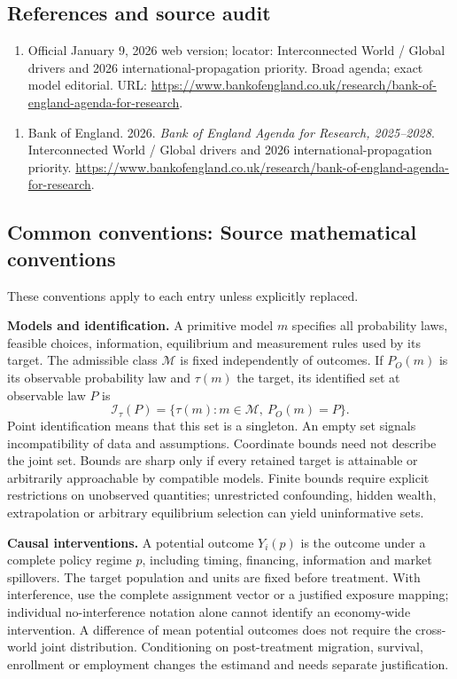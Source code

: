\documentclass[11pt,a4paper]{article}
\begin{document}
\subsection*{References and source audit}
\begin{enumerate}
\item Official January 9, 2026 web version; locator: Interconnected World / Global drivers and 2026 international-propagation priority. Broad agenda; exact model editorial. URL: \url{https://www.bankofengland.co.uk/research/bank-of-england-agenda-for-research}.
\end{enumerate}
\begin{enumerate}\raggedright
\item\hypertarget{definitions:source:30007615:1}{} Bank of England. 2026. \emph{Bank of England Agenda for Research, 2025–2028}. Interconnected World / Global drivers and 2026 international-propagation priority.
\url{https://www.bankofengland.co.uk/research/bank-of-england-agenda-for-research}.
\end{enumerate}

\subsection*{Common conventions: Source mathematical conventions}

These conventions apply to each entry unless explicitly replaced.

\textbf{Models and identification.} A primitive model \(m\) specifies all probability laws, feasible choices, information, equilibrium and measurement rules used by its target. The admissible class \(\mathcal M\) is fixed independently of outcomes. If \(P_O(m)\) is its observable probability law and \(\tau(m)\) the target, its identified set at observable law \(P\) is
\[
 \mathcal I_\tau(P)=\{\tau(m):m\in\mathcal M,\ P_O(m)=P\}.
\]
Point identification means that this set is a singleton. An empty set signals incompatibility of data and assumptions. Coordinate bounds need not describe the joint set. Bounds are sharp only if every retained target is attainable or arbitrarily approachable by compatible models. Finite bounds require explicit restrictions on unobserved quantities; unrestricted confounding, hidden wealth, extrapolation or arbitrary equilibrium selection can yield uninformative sets.

\textbf{Causal interventions.} A potential outcome \(Y_i(p)\) is the outcome under a complete policy regime \(p\), including timing, financing, information and market spillovers. The target population and units are fixed before treatment. With interference, use the complete assignment vector or a justified exposure mapping; individual no-interference notation alone cannot identify an economy-wide intervention. A difference of mean potential outcomes does not require the cross-world joint distribution. Conditioning on post-treatment migration, survival, enrollment or employment changes the estimand and needs separate justification.
\end{document}
